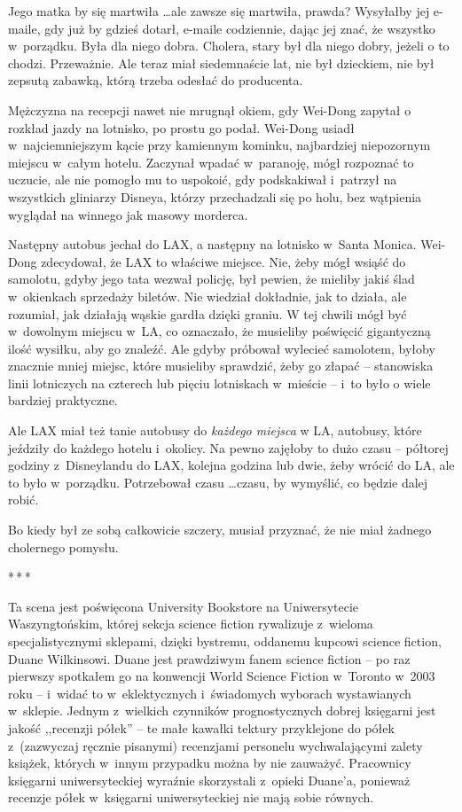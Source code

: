 \documentclass[oneside,polish,11pt,rmheadings]{mwbk}
\newcommand{\threeast}{\par\centerline{*\,*\,*}\medskip\par}
\begin{document}
Jego matka by się martwiła \ldots  ale zawsze się martwiła, prawda? Wysyłałby jej e-maile, gdy już by gdzieś dotarł, e-maile codziennie, dając jej znać, że wszystko w~porządku. Była dla niego dobra. Cholera, stary był dla niego dobry, jeżeli o to chodzi. Przeważnie. Ale teraz miał siedemnaście lat, nie był dzieckiem, nie był zepsutą zabawką, którą trzeba odesłać do producenta. 


Mężczyzna na recepcji nawet nie mrugnął okiem, gdy Wei-Dong zapytał o rozkład jazdy na lotnisko, po prostu go podał. Wei-Dong usiadł w~najciemniejszym kącie przy kamiennym kominku, najbardziej niepozornym miejscu w~całym hotelu. Zaczynał wpadać w~paranoję, mógł rozpoznać to uczucie, ale nie pomogło mu to uspokoić, gdy podskakiwał i~patrzył na wszystkich gliniarzy Disneya, którzy przechadzali się po holu, bez wątpienia wyglądał na winnego jak masowy morderca. 


Następny autobus jechał do LAX, a następny na lotnisko w~Santa Monica. Wei-Dong zdecydował, że LAX to właściwe miejsce. Nie, żeby mógł wsiąść do samolotu, gdyby jego tata wezwał policję, był pewien, że mieliby jakiś ślad w~okienkach sprzedaży biletów. Nie wiedział dokładnie, jak to działa, ale rozumiał, jak działają wąskie gardła dzięki graniu. W tej chwili mógł być w~dowolnym miejscu w~LA, co oznaczało, że musieliby poświęcić gigantyczną ilość wysiłku, aby go znaleźć. Ale gdyby próbował wylecieć samolotem, byłoby znacznie mniej miejsc, które musieliby sprawdzić, żeby go złapać -- stanowiska linii lotniczych na czterech lub pięciu lotniskach w~mieście -- i~to było o wiele bardziej praktyczne. 


Ale LAX miał też tanie autobusy do \textit{każdego miejsca }w LA, autobusy, które jeździły do każdego hotelu i~okolicy. Na pewno zajęłoby to dużo czasu -- półtorej godziny z~Disneylandu do LAX, kolejna godzina lub dwie, żeby wrócić do LA, ale to było w~porządku. Potrzebował czasu \ldots  czasu, by wymyślić, co będzie dalej robić. 


Bo kiedy był ze sobą całkowicie szczery, musiał przyznać, że nie miał żadnego cholernego pomysłu. 


\bigskip
\threeast


Ta scena jest poświęcona University Bookstore na Uniwersytecie Waszyngtońskim, której sekcja science fiction rywalizuje z~wieloma specjalistycznymi sklepami, dzięki bystremu, oddanemu kupcowi science fiction, Duane Wilkinsowi. Duane jest prawdziwym fanem science fiction -- po raz pierwszy spotkałem go na konwencji World Science Fiction w~Toronto w~2003 roku -- i~widać to w~eklektycznych i~świadomych wyborach wystawianych w~sklepie. Jednym z~wielkich czynników prognostycznych dobrej księgarni jest jakość ,,recenzji półek'' -- te małe kawałki tektury przyklejone do półek z~(zazwyczaj ręcznie pisanymi) recenzjami personelu wychwalającymi zalety książek, których w~innym przypadku można by nie zauważyć. Pracownicy księgarni uniwersyteckiej wyraźnie skorzystali z~opieki Duane'a, ponieważ recenzje półek w~księgarni uniwersyteckiej nie mają sobie równych. 
\end{document}
